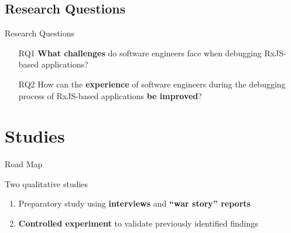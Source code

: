 \documentclass[aspectratio=169]{beamer}
\begin{document}
\subsection{Research Questions}

\begin{frame}[fragile]{Research Questions}
    \begin{enumerate}
        \vfill\item[RQ1] \textbf{What challenges} do software engineers face when debugging RxJS-based applications?
        \vfill\item[RQ2] How can the \textbf{experience} of software engineers during the debugging process of RxJS-based applications \textbf{be improved}?
    \end{enumerate}
\end{frame}



\section{Studies}

\begin{frame}[fragile]{Road Map}
    \begin{vfilleditems}
        \item Two qualitative studies
        \begin{enumerate}
            \vfill\item Preparatory study using \textbf{interviews} and \textbf{``war story'' reports}
            \vfill\item \textbf{Controlled experiment} to validate previously identified findings
        \end{enumerate}
    \end{vfilleditems}
\end{frame}

\end{document}
